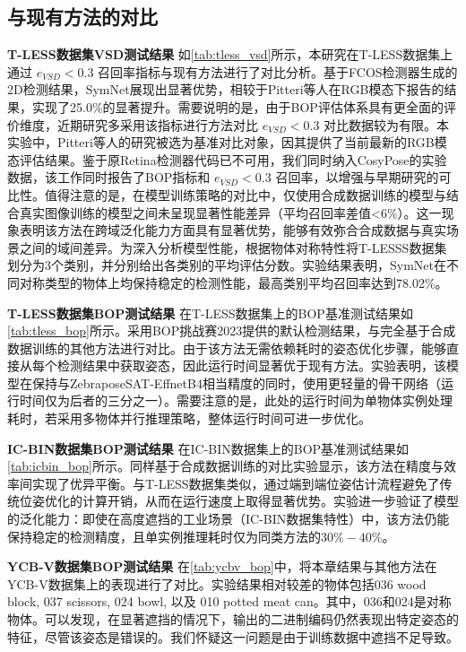 \subsection{与现有方法的对比}

\textbf{T-LESS数据集VSD测试结果 } 如\autoref{tab:tless_vsd}所示，本研究在T-LESS数据集上通过 $e_{VSD}<0.3$ 召回率指标与现有方法进行了对比分析。基于FCOS\cite{fcos}检测器生成的2D检测结果，SymNet展现出显著优势，相较于Pitteri等人\cite{pitteri2019object}在RGB模态下报告的结果，实现了25.0\%的显著提升。需要说明的是，由于BOP评估体系具有更全面的评价维度，近期研究多采用该指标进行方法对比 $e_{VSD}<0.3$ 对比数据较为有限。本实验中，Pitteri等人的研究被选为基准对比对象，因其提供了当前最新的RGB模态评估结果。鉴于原Retina检测器代码已不可用，我们同时纳入CosyPose\cite{labbe2020cosypose}的实验数据，该工作同时报告了BOP指标和 $e_{VSD}<0.3$ 召回率，以增强与早期研究的可比性。值得注意的是，在模型训练策略的对比中，仅使用合成数据训练的模型与结合真实图像训练的模型之间未呈现显著性能差异（平均召回率差值<6\%）。这一现象表明该方法在跨域泛化能力方面具有显著优势，能够有效弥合合成数据与真实场景之间的域间差异。为深入分析模型性能，根据物体对称特性将T-LESSS数据集划分为3个类别，并分别给出各类别的平均评估分数。实验结果表明，SymNet在不同对称类型的物体上均保持稳定的检测性能，最高类别平均召回率达到78.02\%。



\textbf{T-LESS数据集BOP测试结果 } 在T-LESS数据集上的BOP基准测试结果如\autoref{tab:tless_bop}所示。采用BOP挑战赛2023\cite{hodan2024bop}提供的默认检测结果，与完全基于合成数据训练的其他方法进行对比。由于该方法无需依赖耗时的姿态优化步骤，能够直接从每个检测结果中获取姿态，因此运行时间显著优于现有方法。实验表明，该模型在保持与ZebraposeSAT-EffnetB4相当精度的同时，使用更轻量的骨干网络（运行时间仅为后者的三分之一）。需要注意的是，此处的运行时间为单物体实例处理耗时，若采用多物体并行推理策略，整体运行时间可进一步优化。



\textbf{IC-BIN数据集BOP测试结果 } 在IC-BIN数据集上的BOP基准测试结果如\autoref{tab:icbin_bop}所示。同样基于合成数据训练的对比实验显示，该方法在精度与效率间实现了优异平衡。与T-LESS数据集类似，通过端到端位姿估计流程避免了传统位姿优化的计算开销，从而在运行速度上取得显著优势。实验进一步验证了模型的泛化能力：即使在高度遮挡的工业场景（IC-BIN数据集特性）中，该方法仍能保持稳定的检测精度，且单实例推理耗时仅为同类方法的$30\%-40\%$。



\textbf{YCB-V数据集BOP测试结果 } 在\autoref{tab:ycbv_bop}中，将本章结果与其他方法在YCB-V数据集上的表现进行了对比。实验结果相对较差的物体包括036 wood block, 037 scissors, 024 bowl, 以及 010 potted meat can。其中，036和024是对称物体。可以发现，在显著遮挡的情况下，输出的二进制编码仍然表现出特定姿态的特征，尽管该姿态是错误的。我们怀疑这一问题是由于训练数据中遮挡不足导致。

